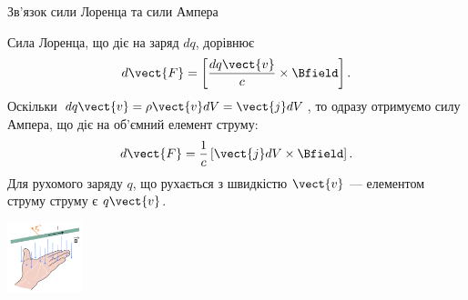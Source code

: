 \documentclass{beamer}
\begin{document}
\begin{frame}{Зв'язок сили Лоренца та сили Ампера}{}
	\begin{block}{}
		Сила Лоренца, що діє на заряд $dq$, дорівнює
		\begin{equation*}
			d\vect{F} = \left[\frac{dq \vect{v}}{c}\times\Bfield\right].
		\end{equation*}
		Оскільки $dq \vect{v} = \rho \vect{v} dV = \vect{j} dV$, то одразу отримуємо силу Ампера, що діє на об'ємний елемент струму:
		\begin{equation*}
			d\vect{F} = \frac1c \left[ \vect{j}dV \times \Bfield\right].
		\end{equation*}
		Для рухомого заряду $q$, що рухається з швидкістю $\vect{v}$ --- \alert{елементом струму струму є $q\vect{v}$}.
	\end{block}
\begin{center}
\includegraphics[width=2.2cm]{LeftHandRule}
\end{center}
\end{frame}
\end{document}
